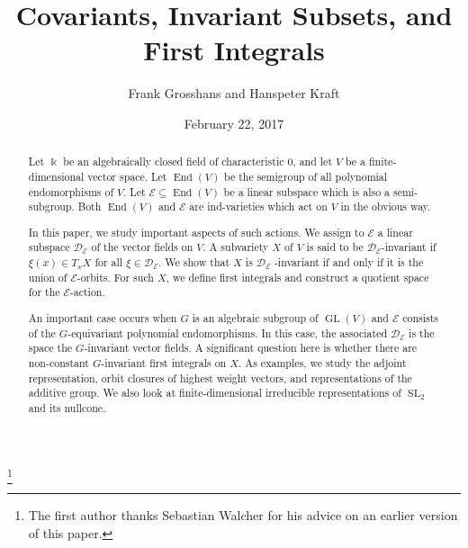 \documentclass{amsart}
\theoremstyle{definition}
\theoremstyle{remark}
\begin{document}
\title{Covariants, Invariant Subsets, and First Integrals}

\author{Frank Grosshans and Hanspeter Kraft}
\date{February 22, 2017}

\address{Department of Mathematics
\newline
\indent West Chester University, West Chester, PA 19383, USA}
\address{Departement Mathematik und Informatik, 
Universit\"at Basel,\newline
\indent Spiegelgasse 1, CH-4051 Basel, Switzerland}
\thanks{The first author thanks Sebastian Walcher for his advice on an earlier version of this paper.}


\begin{abstract}
Let ${\Bbbk}$ be an algebraically closed field of characteristic $0$, and
let $V$ be a finite-dimensional vector space. Let $\operatorname{End}(V)$ be the
semigroup of all polynomial endomorphisms of $V$. Let ${\mathcal E}{\subseteq}
\operatorname{End}(V)$ be a linear subspace which is also a semi-subgroup. Both $\operatorname{End}(V)$ and
${\mathcal E}$ are ind-varieties which act on $V$ in the obvious way. 

In this paper, we study important aspects
of such actions. We assign to ${\mathcal E}$ a linear subspace
${\mathcal D}_{\mathcal E}$ of the vector fields on $V$. A subvariety $X$ of $V$ is said to
be ${\mathcal D}_{\mathcal E}$-invariant if $\xi(x)\in T_{x}X$ for all $\xi
\in{\mathcal D}_{\mathcal E}$. We show that $X$ is ${\mathcal D}_{\mathcal E}$ -invariant if and
only if it is the union of ${\mathcal E}$-orbits.
For such $X$, we define first integrals and construct a quotient space for the ${\mathcal E}$-action. 

An important case occurs when $G$ is an algebraic subgroup of $\operatorname{GL}(V)$ and
${\mathcal E}$ consists of the $G$-equivariant polynomial endomorphisms.
In this case, the associated ${\mathcal D}_{\mathcal E}$ is the space the $G$-invariant vector fields.
A significant question here is whether there are non-constant $G$-invariant first integrals on $X$. 
As examples, we study the adjoint
representation, orbit closures of highest weight vectors, and representations of the
additive group. We also look at finite-dimensional
irreducible representations of $\operatorname{SL}_{2}$ and
its nullcone.
\end{abstract}
\end{document}
